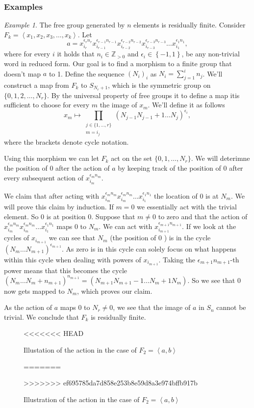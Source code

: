 \documentclass[titlepage, a4paper]{article}
\newcommand{\Z}{\mathbb{Z}}
\theoremstyle{remark}
\newtheorem{example}{Example}
\begin{document}
\subsubsection{Examples}

\begin{example}
	The free group generated by $n$ elements is residually finite. 
	Consider $F_k = \left<x_1, x_2, x_3, \ldots, x_k \right>$.
Let \[
a = x_{i_r}^{\epsilon_r n_r}x_{i_{r-1}}^{\epsilon_{r-1}n_{r-1}}x_{i_{r-2}}^{\epsilon_{r-2}n_{r-2}}x_{i_{r-3}}^{\epsilon_{r-3}n_{r-3}} \ldots x_{i_1}^{\epsilon_1n_1}
,\]
where for every $i$ it holds that $n_i \in \Z_{>0}$ and $\epsilon_i \in \left\{ -1,1 \right\} $, be any non-trivial word in reduced form. 
Our goal is to find a morphism to a finite group that doesn't map $a$ to 1. 
Define the sequence $(N_i)_i$ as $N_i = \sum_{j = 1}^{i} n_j$. 
We'll construct a map from $F_k$ to $S_{N_r + 1}$, which is the symmetric group on $\{0,1, 2, \ldots, N_{r}\} $.
By the universal property of free groups it to define a map itis sufficient to choose for every $m$ the image of $x_m$.
We'll define it as follows
\[
x_m \mapsto \prod_{\substack{j \in \{1,\ldots, r\} \\ m = i_j} } (N_{j-1} N_{j-1}+1 \ldots N_{j})^{\epsilon_i}
,\] 
where the brackets denote cycle notation.

Using this morphism we can let $F_k$ act on the set $\{0,1,\ldots, N_r\} $. 
We will deterimne the position of $0$ after the action of $a$ by keeping track of the position of $0$ after every subsequent  action of  $x_{i_m}^{\epsilon_m n_m}$.

We claim that after acting with $x_{i_{m}}^{\epsilon_{m}n_{m}}x_{i_{m}}^{\epsilon_{m}n_{m}} \ldots x_{i_1}^{\epsilon_1n_1}$ the location of  $0$ is at $N_m$.
We will prove this claim by induction.
If  $m=0$ we essentially act with the trivial element. So $0$ is at position $0$.
 Suppose that $m \ne 0$ to zero and that the action of $x_{i_{m}}^{\epsilon_{m}n_{m}}x_{i_{m}}^{\epsilon_{m}n_{m}} \ldots x_{i_1}^{\epsilon_1n_1}$ maps $0$ to $N_m$. 
 We can act with  $x_{i_{m+1}}^{\epsilon_{m+1}n_{m+1}}$. 
 If we look at the cycles of $x_{i_{m+1}}$ we can see that $N_m$ (the position of  $0$ ) is in the cycle $(N_m \ldots N_{m+1})^{\epsilon_{m+1}}$. As zero is in this cycle can solely focus on what happens within this cycle when dealing with powers of $x_{i_{m+1}}$. 
 Taking the $\epsilon _{m+1} n_{m+1}$-th power means that this becomes the cycle $(N_m \ldots N_{m} + n_{m+1})^{n_{m+1}} = (N_{m+1} N_{m+1}-1 \ldots N_m + 1 N_m)$. 
So we see that $0$ now gets mapped to $N_m$, which proves our claim.

As the action of  $a$ maps $0$ to $N_r \ne 0$, we see that the image of  $a$ in  $S_n$ cannot be trivial. 
We conclude that $F_k$ is residually finite.

\begin{figure}[ht]
	\centering
	
<<<<<<< HEAD
	\caption{Illustation of the action in the case of $F_2 = \left<a,b \right>$}
=======
	\caption{Illustration of the action in the case of $F_2 = \left<a,b \right>$}
>>>>>>> ef695785da7d858e253b8e59d8a3e974bffb917b
	\label{fig:}
\end{figure}

\end{example}
\end{document}
